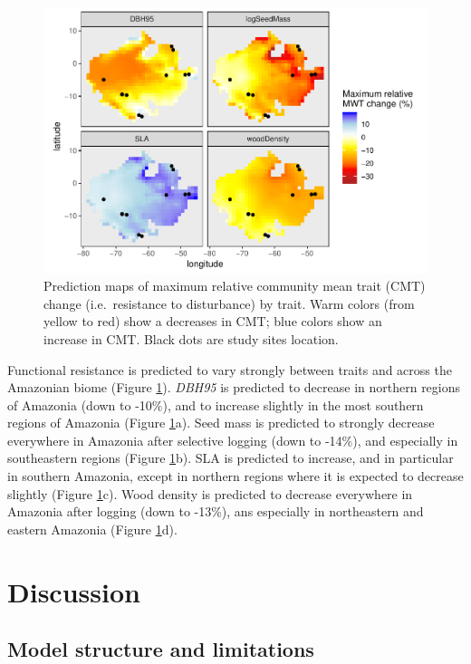 \documentclass[]{elsarticle} %
\makeatletter
\def\maxwidth{\ifdim\Gin@nat@width>\linewidth\linewidth
\else\Gin@nat@width\fi}
\let\Oldincludegraphics\includegraphics
\renewcommand{\includegraphics}[1]{\Oldincludegraphics[width=\maxwidth]{#1}}
\makeatother
\begin{document}
\begin{figure}
\centering
\includegraphics{rticle_tmfo_functional_files/figure-latex/maps_pred-1.pdf}
\caption{\label{fig:predmap}Prediction maps of maximum relative
community mean trait (CMT) change (i.e.~resistance to disturbance) by
trait. Warm colors (from yellow to red) show a decreases in CMT; blue
colors show an increase in CMT. Black dots are study sites location.}
\end{figure}

Functional resistance is predicted to vary strongly between traits and
across the Amazonian biome (Figure \ref{fig:predmap}). \emph{DBH95} is
predicted to decrease in northern regions of Amazonia (down to -10\%),
and to increase slightly in the most southern regions of Amazonia
(Figure \ref{fig:predmap}a). Seed mass is predicted to strongly decrease
everywhere in Amazonia after selective logging (down to -14\%), and
especially in southeastern regions (Figure \ref{fig:predmap}b). SLA is
predicted to increase, and in particular in southern Amazonia, except in
northern regions where it is expected to decrease slightly (Figure
\ref{fig:predmap}c). Wood density is predicted to decrease everywhere in
Amazonia after logging (down to -13\%), ans especially in northeastern
and eastern Amazonia (Figure \ref{fig:predmap}d).

\section{Discussion}\label{discussion}

\subsection{Model structure and
limitations}\label{model-structure-and-limitations}
\end{document}

